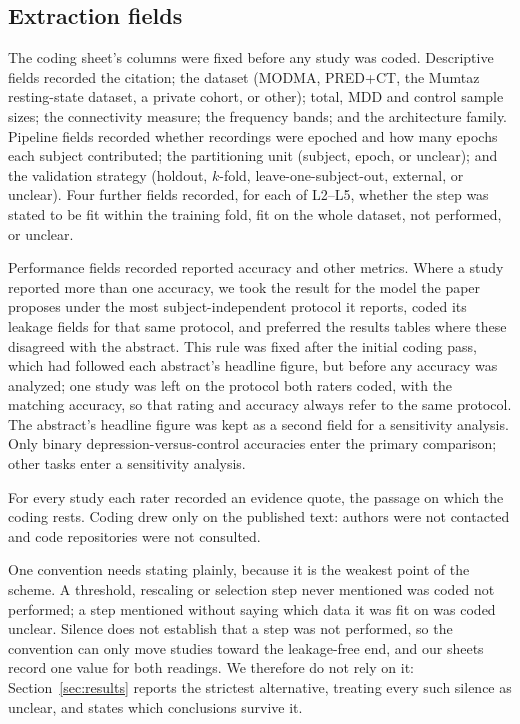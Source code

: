 \subsection{Extraction fields}
The coding sheet's columns were fixed before any study was coded. Descriptive fields recorded the citation; the dataset (MODMA, PRED+CT, the Mumtaz resting-state dataset, a private cohort, or other); total, MDD and control sample sizes; the connectivity measure; the frequency bands; and the architecture family. Pipeline fields recorded whether recordings were epoched and how many epochs each subject contributed; the partitioning unit (subject, epoch, or unclear); and the validation strategy (holdout, $k$-fold, leave-one-subject-out, external, or unclear). Four further fields recorded, for each of L2--L5, whether the step was stated to be fit within the training fold, fit on the whole dataset, not performed, or unclear.

Performance fields recorded reported accuracy and other metrics. Where a study reported more than one accuracy, we took the result for the model the paper proposes under the most subject-independent protocol it reports, coded its leakage fields for that same protocol, and preferred the results tables where these disagreed with the abstract. This rule was fixed after the initial coding pass, which had followed each abstract's headline figure, but before any accuracy was analyzed; one study was left on the protocol both raters coded, with the matching accuracy, so that rating and accuracy always refer to the same protocol. The abstract's headline figure was kept as a second field for a sensitivity analysis. Only binary depression-versus-control accuracies enter the primary comparison; other tasks enter a sensitivity analysis.

For every study each rater recorded an evidence quote, the passage on which the coding rests. Coding drew only on the published text: authors were not contacted and code repositories were not consulted.

One convention needs stating plainly, because it is the weakest point of the scheme. A threshold, rescaling or selection step never mentioned was coded not performed; a step mentioned without saying which data it was fit on was coded unclear. Silence does not establish that a step was not performed, so the convention can only move studies toward the leakage-free end, and our sheets record one value for both readings. We therefore do not rely on it: Section~\ref{sec:results} reports the strictest alternative, treating every such silence as unclear, and states which conclusions survive it.

